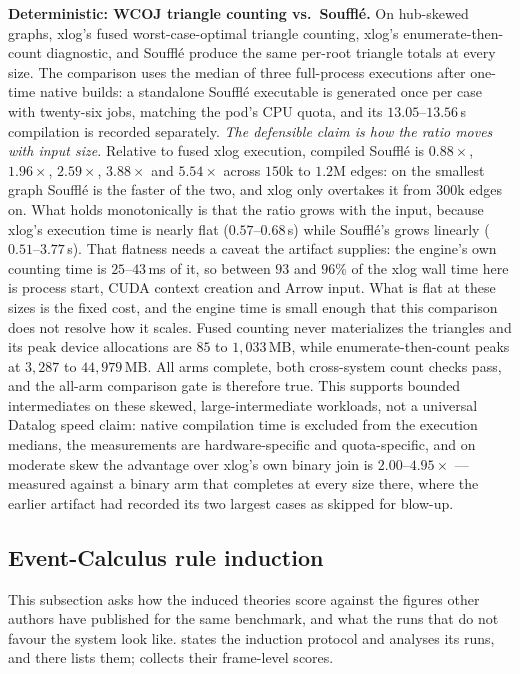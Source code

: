 \textbf{Deterministic: WCOJ triangle counting vs.\ Soufflé.} On hub-skewed graphs, xlog's fused worst-case-optimal triangle counting, xlog's enumerate-then-count diagnostic, and Soufflé produce the same per-root triangle totals at every size. The comparison uses the median of three full-process executions after one-time native builds: a standalone Soufflé executable is generated once per case with twenty-six jobs, matching the pod's CPU quota, and its $13.05$--$13.56$\,s compilation is recorded separately. \emph{The defensible claim is how the ratio moves with input size.} Relative to fused xlog execution, compiled Soufflé is $0.88\times$, $1.96\times$, $2.59\times$, $3.88\times$ and $5.54\times$ across $150$k to $1.2$M edges: on the smallest graph Soufflé is the faster of the two, and xlog only overtakes it from $300$k edges on. What holds monotonically is that the ratio grows with the input, because xlog's execution time is nearly flat ($0.57$--$0.68$\,s) while Soufflé's grows linearly ($0.51$--$3.77$\,s). That flatness needs a caveat the artifact supplies: the engine's own counting time is $25$--$43$\,ms of it, so between $93$ and $96\%$ of the xlog wall time here is process start, CUDA context creation and Arrow input. What is flat at these sizes is the fixed cost, and the engine time is small enough that this comparison does not resolve how it scales. Fused counting never materializes the triangles and its peak device allocations are $85$ to $1{,}033$\,MB, while enumerate-then-count peaks at $3{,}287$ to $44{,}979$\,MB. All arms complete, both cross-system count checks pass, and the all-arm comparison gate is therefore true. This supports bounded intermediates on these skewed, large-intermediate workloads, not a universal Datalog speed claim: native compilation time is excluded from the execution medians, the measurements are hardware-specific and quota-specific, and on moderate skew the advantage over xlog's own binary join is $2.00$--$4.95\times$ --- measured against a binary arm that completes at every size there, where the earlier artifact had recorded its two largest cases as skipped for blow-up.

\subsection{Event-Calculus rule induction}\label{sec:ec-eval}

This subsection asks how the induced theories score against the figures other authors have published for the same benchmark, and what the runs that do not favour the system look like.  states the induction protocol and analyses its runs, and  there lists them;  collects their frame-level scores.

